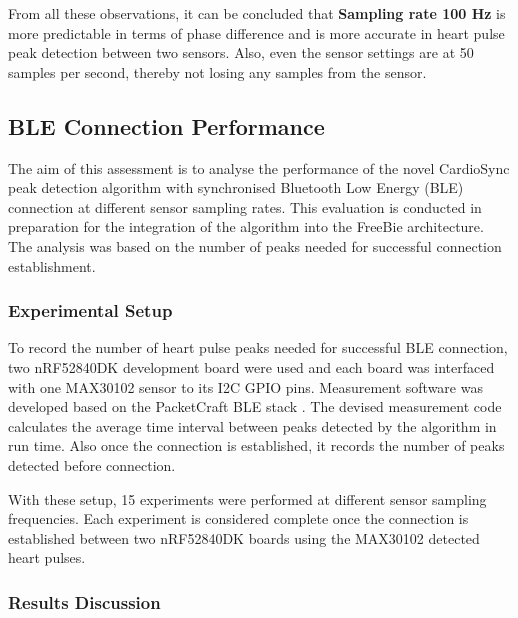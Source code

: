 \noindent From all these observations, it can be concluded that \textbf{\textbf{Sampling rate 100 Hz}} is more predictable in terms of phase difference and is more accurate in heart pulse peak detection between two sensors. Also, even the sensor settings are at 50 samples per second, thereby not losing any samples from the sensor.



\subsection{BLE Connection Performance}

\noindent The aim of this assessment is to analyse the performance of the novel CardioSync peak detection algorithm with synchronised Bluetooth Low Energy (BLE) connection at different sensor sampling rates. This evaluation is conducted in preparation for the integration of the algorithm into the FreeBie architecture. The analysis was based on the number of peaks needed for successful connection establishment.

\subsubsection{Experimental Setup}
To record the number of heart pulse peaks needed for successful BLE connection, two nRF52840DK development board \cite{nRF52840} were used and each board was interfaced with one MAX30102 sensor \cite{2018MAX30102} to its I2C GPIO pins. Measurement software was developed based on the PacketCraft BLE stack \cite{2020Packetcraft}. The devised measurement code calculates the average time interval between peaks detected by the algorithm in run time. Also once the connection is established, it records the number of peaks detected before connection.
\vspace{1\baselineskip}

\noindent With these setup, 15 experiments were performed at different sensor sampling frequencies. Each experiment is considered complete once the connection is established between two nRF52840DK boards using the MAX30102 detected heart pulses.

\subsubsection{Results Discussion}

